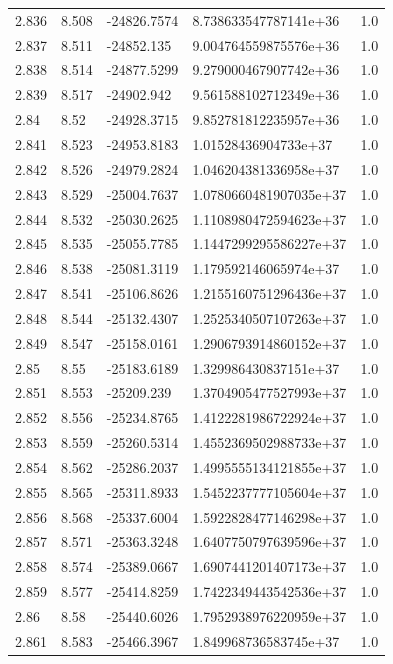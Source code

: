 \begin{tabular}{lllll}
2.836 & 8.508 & -24826.7574 & 8.738633547787141e+36 & 1.0 \\
2.837 & 8.511 & -24852.135 & 9.004764559875576e+36 & 1.0 \\
2.838 & 8.514 & -24877.5299 & 9.279000467907742e+36 & 1.0 \\
2.839 & 8.517 & -24902.942 & 9.561588102712349e+36 & 1.0 \\
2.84 & 8.52 & -24928.3715 & 9.852781812235957e+36 & 1.0 \\
2.841 & 8.523 & -24953.8183 & 1.01528436904733e+37 & 1.0 \\
2.842 & 8.526 & -24979.2824 & 1.046204381336958e+37 & 1.0 \\
2.843 & 8.529 & -25004.7637 & 1.0780660481907035e+37 & 1.0 \\
2.844 & 8.532 & -25030.2625 & 1.1108980472594623e+37 & 1.0 \\
2.845 & 8.535 & -25055.7785 & 1.1447299295586227e+37 & 1.0 \\
2.846 & 8.538 & -25081.3119 & 1.179592146065974e+37 & 1.0 \\
2.847 & 8.541 & -25106.8626 & 1.2155160751296436e+37 & 1.0 \\
2.848 & 8.544 & -25132.4307 & 1.2525340507107263e+37 & 1.0 \\
2.849 & 8.547 & -25158.0161 & 1.2906793914860152e+37 & 1.0 \\
2.85 & 8.55 & -25183.6189 & 1.329986430837151e+37 & 1.0 \\
2.851 & 8.553 & -25209.239 & 1.3704905477527993e+37 & 1.0 \\
2.852 & 8.556 & -25234.8765 & 1.4122281986722924e+37 & 1.0 \\
2.853 & 8.559 & -25260.5314 & 1.4552369502988733e+37 & 1.0 \\
2.854 & 8.562 & -25286.2037 & 1.4995555134121855e+37 & 1.0 \\
2.855 & 8.565 & -25311.8933 & 1.5452237777105604e+37 & 1.0 \\
2.856 & 8.568 & -25337.6004 & 1.5922828477146298e+37 & 1.0 \\
2.857 & 8.571 & -25363.3248 & 1.6407750797639596e+37 & 1.0 \\
2.858 & 8.574 & -25389.0667 & 1.6907441201407173e+37 & 1.0 \\
2.859 & 8.577 & -25414.8259 & 1.7422349443542536e+37 & 1.0 \\
2.86 & 8.58 & -25440.6026 & 1.7952938976220959e+37 & 1.0 \\
2.861 & 8.583 & -25466.3967 & 1.849968736583745e+37 & 1.0 \\

\end{tabular}
